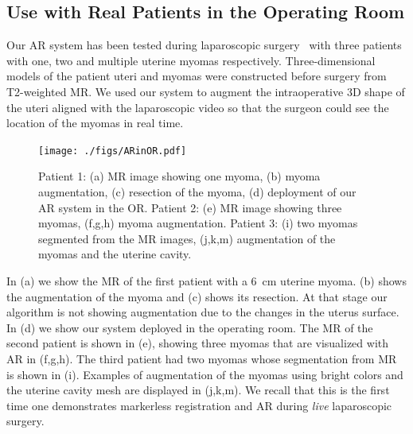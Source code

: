 \subsection{Use with Real Patients in the Operating Room}
Our AR system has been tested during laparoscopic surgery~\cite{bourdel2017} with three patients with one, two and multiple uterine myomas respectively. Three-dimensional models of the patient uteri and myomas were constructed before surgery from T2-weighted MR. We used our system to augment the intraoperative 3D shape of the uteri aligned with the laparoscopic video
so that the surgeon could see the location of the myomas in real time. 
\begin{figure}[t]
  \centering
  \texttt{[image: ./figs/ARinOR.pdf]}
\caption{Patient 1: (a) MR image showing one myoma, (b) myoma augmentation, (c) resection of the myoma, (d) deployment of our AR system in the OR. Patient 2: (e) MR image showing three myomas, (f,g,h) myoma augmentation. Patient 3: (i) two myomas segmented from the MR images, (j,k,m) augmentation of the myomas and the uterine cavity.}
\label{fig:realOR}
\end{figure}
In (a) we show the MR of the first patient with a 6~cm uterine myoma. (b) shows the augmentation of the myoma and (c) shows its resection. At that stage our algorithm is not showing augmentation due to the changes in the uterus surface. In (d) we show our system deployed in the operating room. The MR of the second patient is shown in (e), showing three myomas that are visualized with AR in (f,g,h). The third patient had two myomas whose segmentation from MR is shown in (i). Examples of augmentation of the myomas using bright colors and the uterine cavity mesh are displayed in (j,k,m). We recall that this is the first time one demonstrates markerless registration and AR during \emph{live} laparoscopic surgery.     
 

